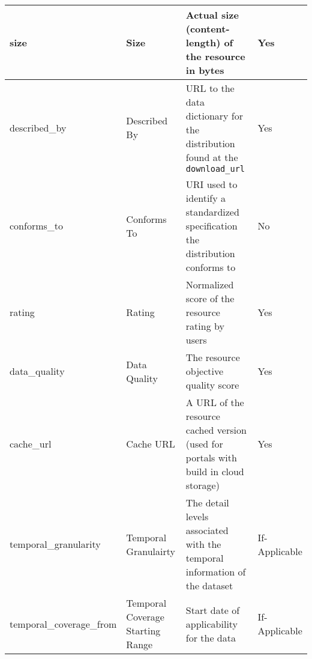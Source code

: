 \begin{center}
{\begin{longtable}[h]{|l|p{2cm}|p{9cm}|c|}
size                              & Size                             & Actual size (content-length) of the resource in bytes                                                                                                                                          & \multicolumn{1}{l|}{Yes}            \\ \hline
described\_by                     & Described By                     & URL to the data dictionary for the distribution found at the \texttt{download\_url}                                                                                                          & \multicolumn{1}{l|}{Yes}            \\ \hline
conforms\_to                      & Conforms To                      & URI used to identify a standardized specification the distribution conforms to                                                                                                                 & \multicolumn{1}{l|}{No}             \\ \hline
rating                            & Rating                           & Normalized score of the resource rating by users                                                                                                                                               & \multicolumn{1}{l|}{Yes}            \\ \hline
data\_quality                     & Data Quality                     & The resource objective quality score                                                                                                                                                           & \multicolumn{1}{l|}{Yes}            \\ \hline
cache\_url                        & Cache URL                        & A URL of the resource cached version (used for portals with build in cloud storage)                                                                                                            & \multicolumn{1}{l|}{Yes}            \\ \hline
temporal\_granularity             & Temporal Granulairty             & The detail levels associated with the temporal information of the dataset                                                                                                                      & \multicolumn{1}{l|}{If-Applicable}  \\ \hline
temporal\_coverage\_from          & Temporal Coverage Starting Range & Start date of applicability for the data                                                                                                                                                       & \multicolumn{1}{l|}{If-Applicable}  \\ \hline

\end{longtable}}
\end{center}
